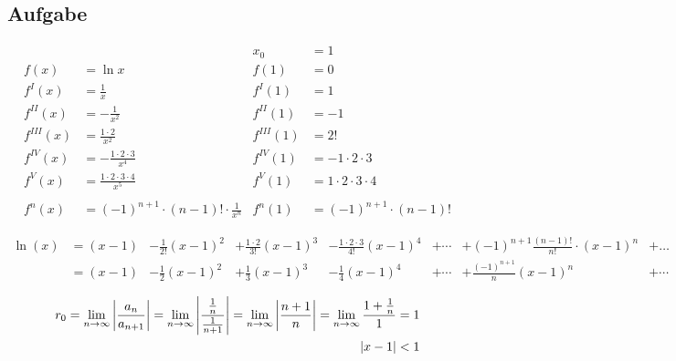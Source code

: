 \subsection{Aufgabe}

\begin{align*}
    & & x_0 &= 1 \\
    f(x) &= \ln x & f(1) &= 0 \\
    f^{I}(x) &= \frac{1}{x} & f^{I}(1) &= 1 \\
    f^{II}(x) &= -\frac{1}{x^2} & f^{II}(1) &= -1 \\
    f^{III}(x) &= \frac{1 \cdot 2}{x^2} & f^{III}(1) &= 2! \\
    f^{IV}(x) &= -\frac{1 \cdot 2 \cdot 3}{x^4} & f^{IV}(1) &= -1 \cdot 2 \cdot 3 \\
    f^{V}(x) &= \frac{1 \cdot 2 \cdot 3 \cdot 4}{x^5} & f^{V}(1) &= 1 \cdot 2 \cdot 3 \cdot 4 \\
    \\
    f^n(x) &= {(-1)}^{n+1} \cdot (n-1)! \cdot \frac{1}{x^n} & f^n(1) &= {(-1)}^{n+1} \cdot (n-1)!
\end{align*}

\begin{align*}
    \ln(x)
    &= (x - 1) &- \frac{1}{2!} {(x - 1)}^2 &+ \frac{1 \cdot 2}{3!} {(x - 1)}^3 &- \frac{1 \cdot 2 \cdot 3}{4!} {(x - 1)}^4 &+ \cdots &+ {(-1)}^{n+1} \frac{(n-1)!}{n!} \cdot {(x - 1)}^n &+ \ldots \\
    &= (x - 1) &- \frac{1}{2} {(x - 1)}^2 &+ \frac{1}{3} {(x - 1)}^3 &- \frac{1}{4} {(x - 1)}^4 &+ \cdots &+ \frac{{(-1)}^{n+1}}{n} {(x - 1)}^n &+ \cdots
\end{align*}

\begin{align*}
    r_0 = \lim_{n \rightarrow{} \infty} \left| \frac{a_n}{a_{n+1}} \right|
        = \lim_{n \rightarrow{} \infty} \left| \frac{\frac{1}{n}}{\frac{1}{n+1}} \right|
        = \lim_{n \rightarrow{} \infty} \left| \frac{n+1}{n} \right|
        = \lim_{n \rightarrow{} \infty} \frac{1 + \frac{1}{n}}{1}
        = 1 \\
    \left| x - 1 \right| < 1
\end{align*}


\begin{figure}[H]
    \centering
\end{figure}


